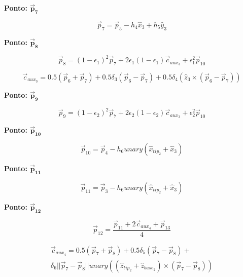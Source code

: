 \documentclass[10pt,a4paper]{report}
\begin{document}
\textbf{Ponto: {$\boldsymbol{\vec{p}_{7}}$}}

\begin{equation}
\vec{p}_{7} = \vec{p}_{5} - h_{4} \hat{x}_{3} + h_{5} \hat{y}_{3}
\label{eq:p7}
\end{equation}

\textbf{Ponto: {$\boldsymbol{\vec{p}_{8}}$}}

\begin{equation}
\vec{p}_{8} = (1 - \epsilon_{1})^{2} \vec{p}_{7} + 2 \epsilon_{1} (1 - \epsilon_{1}) \vec{c}_{aux_{3}} + \epsilon_{1}^{2} \vec{p}_{10}
\label{eq:p8}
\end{equation}

\begin{equation}
\vec{c}_{aux_{3}} = 0.5 (\vec{p}_{6} + \vec{p}_{7}) + 0.5 \delta_{3} (\vec{p}_{6} - \vec{p}_{7}) + 0.5 \delta_{4} (\hat{z}_{3} \times (\vec{p}_{6} - \vec{p}_{7}))
\label{eq:c_aux_3}
\end{equation}

\textbf{Ponto: {$\boldsymbol{\vec{p}_{9}}$}}

\begin{equation}
\vec{p}_{9} = (1 - \epsilon_{2})^{2} \vec{p}_{7} + 2 \epsilon_{2} (1 - \epsilon_{2}) \vec{c}_{aux_{3}} + \epsilon_{2}^{2} \vec{p}_{10}
\label{eq:p9}
\end{equation}

\textbf{Ponto: {$\boldsymbol{\vec{p}_{10}}$}}

\begin{equation}
\vec{p}_{10} = \vec{p}_{4} - h_{6} unary(\hat{x}_{tip_{2}} + \hat{x}_{3})
\label{eq:p10}
\end{equation}

\textbf{Ponto: {$\boldsymbol{\vec{p}_{11}}$}}

\begin{equation}
\vec{p}_{11} = \vec{p}_{3} - h_{6} unary(\hat{x}_{tip_{2}} + \hat{x}_{3})
\label{eq:p11}
\end{equation}

\textbf{Ponto: {$\boldsymbol{\vec{p}_{12}}$}}

\begin{equation}
\vec{p}_{12} = \frac{\vec{p}_{11} + 2 \vec{c}_{aux_{4}} + \vec{p}_{13}}{4}
\label{eq:p12}
\end{equation}

\begin{multline}
\vec{c}_{aux_{4}} = 0.5 (\vec{p}_{7} + \vec{p}_{8}) + 0.5 \delta_{5} (\vec{p}_{7} - \vec{p}_{8}) + \\ \delta_{6} || \vec{p}_{7} - \vec{p}_{8} || unary( (\hat{z}_{tip_{2}} + \hat{z}_{base_{2}}) \times (\vec{p}_{7} - \vec{p}_{8}))
\label{eq:c_aux_4}
\end{multline}
\end{document}
